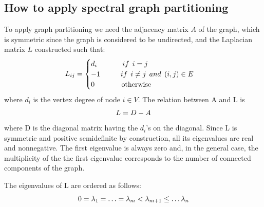 \documentclass[]{usiinfbachelorproject}
\newcommand\tab[1][1cm]{\hspace*{#1}}
\begin{document}

\subsection{How to apply spectral graph partitioning}
To apply graph partitioning we need the adjacency matrix $A$ of the graph, which is symmetric since the graph is considered to be undirected, and the Laplacian matrix $L$ constructed such that: 
\begin{equation}\notag
L_{ij} = 
\begin{cases}
d_i \tab \:\:\: if \:\: i=j \\
-1 \tab if \:\: i \neq j \:\: and \: \: (i,j) \in E \\
0 \tab \:\:\:\: \text{otherwise}
\end{cases}
\end{equation}
where $d_i$ is the vertex degree of node $i \in V$.
The relation between A and L is
\begin{equation}\notag
L = D - A
\end{equation}
where D is the diagonal matrix having the $d_i$'s on the diagonal. Since L is symmetric and positive semidefinite by construction, all its eigenvalues are real and nonnegative. The first eigenvalue is always zero and, in the general case, the multiplicity of the the first eigenvalue corresponds to the number of connected components of the graph.

The eigenvalues of L are ordered as follows:
\begin{equation}\notag
0 = \lambda_1 = \ldots = \lambda_m < \lambda_{m+1} \le \ldots \lambda_n
\end{equation}
\end{document}
